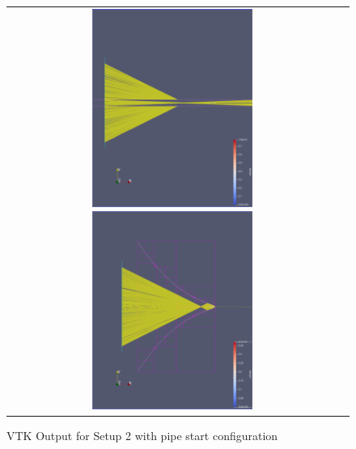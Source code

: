 \documentclass[a4paper,10pt]{article}
\begin{document}
    \begin{figure}
        \centering
        \begin{tabular}{c c}
        \includegraphics[width=0.5\textwidth]{images/open_pipe/start.png}
        \includegraphics[width=0.5\textwidth]{images/open_pipe/0.png}
        \end{tabular}
        \label{fig:setup2_rand}
        \caption[VTK Output for Setup 2 with pipe start configuration]{
            VTK Output for Setup 2 with pipe start configuration
            }
    \end{figure}
\end{document}
